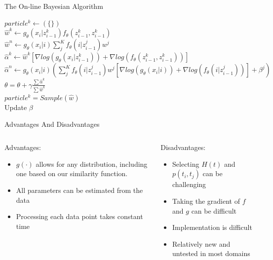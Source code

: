 \documentclass[compress]{beamer}
\begin{document}
\begin{frame}{The On-line Bayesian Algorithm}
\begin{algorithm}[H]
$particle^k \leftarrow (\{\})$ \\
 {
    $\hat{w}^k \leftarrow g_{\theta}(x_i | z_{i-1}^k) 
                            f_{\theta}(z_{i-1}^k, z_{i-1}^k)$ \\
    $\hat{w}^n \leftarrow g_{\theta}(x_i | i) 
                            \sum_j^K f_{\theta}(i |  z_{i-1}^j) 
                            w^j$ \\

    $\hat{\alpha}^k \leftarrow \hat{w}^k 
                              [ \nabla log(g_{\theta}(x_i | z_{i-1}^k))  +
                                \nabla log(f_{\theta}(z_{i-1}^k, z_{i-1}^k))]$ \\
    $\hat{\alpha}^n \leftarrow g_{\theta}(x_i | i)
                              (\sum_j^K f_{\theta}(i |  z_{i-1}^j) w^j
                               [ \nabla log( g_{\theta}(x_i | i) ) +
                                 \nabla log(f_{\theta}(i |  z_{i-1}^j))] + 
                                 \beta^j)$ \\
    $\theta = \theta + \gamma \frac{\sum \hat{\alpha}^k}{\sum \hat{w}^k} $\\
    $particle^k = Sample(\hat{w})$ \\
    Update $\beta$ \\
}

\end{algorithm}
\end{frame}

\begin{frame}{Advantages And Disadvantages}
\begin{columns}[t]
\begin{column}[1]{5cm}
Advantages:
\begin{itemize}
\item $g(\cdot)$ allows for any distribution, including one based on our
similarity function.
\item All parameters can be estimated from the data
\item Processing each data point takes constant time
\end{itemize}
\end{column}

\begin{column}[2]{5cm}
Disadvantages:
\begin{itemize}
\item Selecting $H(t)$ and $p(t_i, t_j)$ can be challenging
\item Taking the gradient of $f$ and $g$ can be difficult
\item Implementation is difficult
\item Relatively new and untested in most domains
\end{itemize}
\end{column}

\end{columns}
\end{frame}
\end{document}
